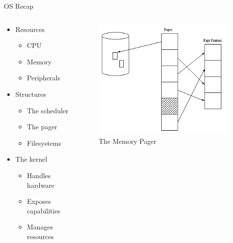 \begin{frame}{OS Recap}
	\begin{columns}[T]
		\begin{column}{.5\textwidth}
			\begin{itemize}
			\item Resources
				\begin{itemize}
				\item CPU
				\item Memory
				\item Peripherals
				\end{itemize}
			\item Structures
				\begin{itemize}
				\item The scheduler
				\item The pager
				\item Filesystems
				\end{itemize}
			\item The kernel
				\begin{itemize}
				\item Handles hardware
				\item Exposes capabilities
				\item Manages resources
				\end{itemize}
			\end{itemize}
		\end{column}
		\begin{column}{.5\textwidth}
			\begin{figure}[ht]
				\vspace*{-0.7cm}
				\caption{The Memory Pager}
				\includegraphics[height=0.3\textheight]{img/pager.png}
			\end{figure}
			\begin{figure}[ht]

\end{figure}
\end{column}
\end{columns}
\end{frame}
